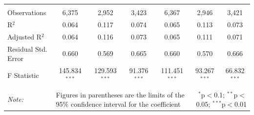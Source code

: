 \documentclass[alpha-refs]{wiley-article-01g}
\begin{document}
\begin{landscape}
\begin{table}[!htbp]
\begin{tabular}{@{\extracolsep{5pt}}lcccccc}
  & & & & & & \\ 
\hline \\[-3ex] 
Observations & 6,375 & 2,952 & 3,423 & 6,367 & 2,946 & 3,421 \\ 
R$^{2}$ & 0.064 & 0.117 & 0.074 & 0.065 & 0.113 & 0.073 \\ 
Adjusted R$^{2}$ & 0.064 & 0.116 & 0.073 & 0.065 & 0.111 & 0.071 \\ 
Residual Std. Error & 0.660 & 0.569 & 0.665 & 0.660 & 0.570 & 0.666 \\ 
F Statistic & 145.834$^{***}$ & 129.593$^{***}$ & 91.376$^{***}$ & 111.451$^{***}$ & 93.267$^{***}$ & 66.832$^{***}$ \\ 
\hline 
\hline \\[-3ex] 
\textit{Note:} &\multicolumn{4}{l}{Figures in parentheses are the limits of the 95\% confidence interval for the coefficient}  & \multicolumn{2}{r}{$^{*}$p$<$0.1; $^{**}$p$<$0.05; $^{***}$p$<$0.01} \\ 
\end{tabular} 
\end{table} 

\end{landscape}

\newpage
\end{document}
